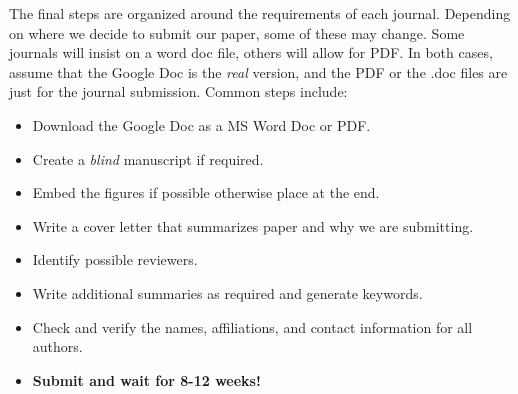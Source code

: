 \documentclass{article}
\begin{document}
The final steps are organized around the requirements of each journal. Depending on where we decide to submit our paper, some of these may change. Some journals will insist on a word doc file, others will allow for PDF. In both cases, assume that the Google Doc is the \textit{real} version, and the PDF or the .doc files are just for the journal submission. Common steps include:
\begin{itemize}
    \item Download the Google Doc as a MS Word Doc or PDF.
    \item Create a \textit{blind} manuscript if required.
    \item Embed the figures if possible otherwise place at the end.
    \item Write a cover letter that summarizes paper and why we are submitting.
    \item Identify possible reviewers.
    \item Write additional summaries as required and generate keywords.
    \item Check and verify the names, affiliations, and contact information for all authors.
    \item \textbf{Submit and wait for 8-12 weeks!}
\end{itemize}
\end{document}
